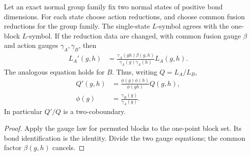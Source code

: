 \begin{lemma}
    \label{lem:mpug_relative_l_gauge}
    \leanok
    Let an exact normal group family fix two normal states of positive bond
    dimensions. For each state choose action reductions, and choose common
    fusion reductions for the group family. The single-state $L$-symbol
    agrees with the one-block $L$-symbol. If the reduction data are changed,
    with common fusion gauge $\beta$ and action gauges $\gamma_A,\gamma_B$,
    then
    \begin{align}
        L_A'(g,h) & =\frac{\gamma_A(gh)\beta(g,h)}
        {\gamma_A(g)\gamma_A(h)}L_A(g,h).
    \end{align}
    The analogous equation holds for $B$. Thus, writing $Q=L_A/L_B$,
    \begin{align}
        Q'(g,h) & =\frac{\phi(g)\phi(h)}{\phi(gh)}Q(g,h), \\
        \phi(g) & =\frac{\gamma_B(g)}{\gamma_A(g)}.
    \end{align}
    In particular $Q'/Q$ is a two-coboundary.
\end{lemma}
\begin{proof}\leanok
    Apply the gauge law for permuted blocks to the one-point block set.
    Its bond identification is the identity. Divide the two gauge equations;
    the common factor $\beta(g,h)$ cancels.
\end{proof}

